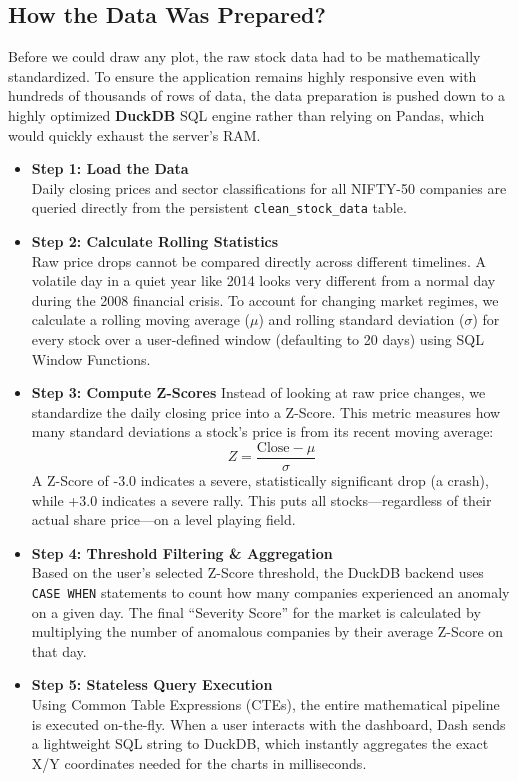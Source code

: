 \documentclass[14pt,a4paper]{extreport}
\begin{document}
\subsection{How the Data Was Prepared?}
Before we could draw any plot, the raw stock data had to be mathematically
standardized. To ensure the application remains highly responsive even
with hundreds of thousands of rows of data, the data preparation is pushed
down to a highly optimized \textbf{DuckDB} SQL engine rather than relying
on Pandas, which would quickly exhaust the server's RAM.

\begin{itemize}[label=]

\item \textbf{Step 1: Load the Data}\\
Daily closing prices and sector classifications for all NIFTY-50 companies
are queried directly from the persistent \texttt{clean\_stock\_data} table.

\item \textbf{Step 2: Calculate Rolling Statistics}\\
Raw price drops cannot be compared directly across different timelines. A
volatile day in a quiet year like 2014 looks very different from a normal
day during the 2008 financial crisis. To account for changing market
regimes, we calculate a rolling moving average ($\mu$) and rolling
standard deviation ($\sigma$) for every stock over a user-defined window
(defaulting to 20 days) using SQL Window Functions.

\item\textbf{Step 3: Compute Z-Scores}
Instead of looking at raw price changes, we standardize the daily closing
price into a Z-Score. This metric measures how many standard deviations a
stock's price is from its recent moving average:
\begin{equation}
Z = \frac{\text{Close} - \mu}{\sigma}
\end{equation}
A Z-Score of -3.0 indicates a severe, statistically significant drop (a
crash), while +3.0 indicates a severe rally. This puts all
stocks---regardless of their actual share price---on a level playing
field.

\item \textbf{Step 4: Threshold Filtering \& Aggregation}\\
Based on the user's selected Z-Score threshold, the DuckDB backend uses
\texttt{CASE WHEN} statements to count how many companies experienced an
anomaly on a given day. The final ``Severity Score'' for the market is
calculated by multiplying the number of anomalous companies by their
average Z-Score on that day.

\item \textbf{Step 5: Stateless Query Execution}\\
Using Common Table Expressions (CTEs), the entire mathematical pipeline is
executed on-the-fly. When a user interacts with the dashboard, Dash sends
a lightweight SQL string to DuckDB, which instantly aggregates the exact
X/Y coordinates needed for the charts in milliseconds.
\end{itemize}
\end{document}
